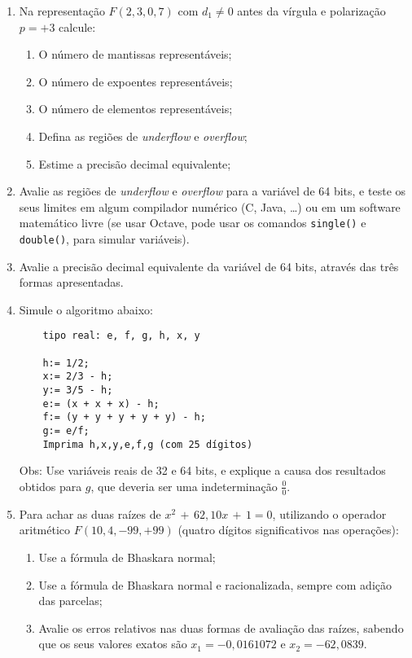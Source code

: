 \documentclass[12pt]{article}
\newenvironment{smallitem}{
    \vspace{-2mm}
    \begin{enumerate}
    \setlength{\parskip}{0pt}
    \setlength{\itemsep}{2pt}
}{
    \vspace{-2mm}
    \end{enumerate}
}
\begin{document}
\begin{enumerate}[label=\textbf{\arabic*})]
\begin{smallitem}
\end{smallitem}

\item Na representação $F(2,3,0,7)$ com $d_1 \neq 0$ antes da vírgula e
polarização $p = +3$ calcule:

\begin{smallitem}

\item O número de mantissas representáveis;
\item O número de expoentes representáveis;
\item O número de elementos representáveis;
\item Defina as regiões de \textit{underflow} e \textit{overflow};
\item Estime a precisão decimal equivalente;

\end{smallitem}

\item Avalie as regiões de \textit{underflow} e \textit{overflow} para a
variável de 64 bits, e teste os seus limites em algum compilador numérico
(C, Java, \dots) ou em um software matemático livre (se usar Octave, pode
usar os comandos \verb!single()! e \verb!double()!, para simular variáveis).

\item Avalie a precisão decimal equivalente da variável de 64 bits, através
das três formas apresentadas.

\item Simule o algoritmo abaixo:
\begin{verbatim}
    tipo real: e, f, g, h, x, y

    h:= 1/2;
    x:= 2/3 - h;
    y:= 3/5 - h;
    e:= (x + x + x) - h;
    f:= (y + y + y + y + y) - h;
    g:= e/f;
    Imprima h,x,y,e,f,g (com 25 dígitos)\end{verbatim}
Obs: Use variáveis reais de 32 e 64 bits, e explique a causa dos resultados
obtidos para $g$, que deveria ser uma indeterminação $\frac{0}{0}$.

\item Para achar as duas raízes de $x^2 \, + \, 62,10x \, + \, 1 = 0$,
utilizando o operador aritmético $F(10, 4, -99, +99)$ (quatro dígitos
significativos nas operações):

\begin{smallitem}

\item Use a fórmula de Bhaskara normal;
\item Use a fórmula de Bhaskara normal e racionalizada, sempre com
adição das parcelas;
\item Avalie os erros relativos nas duas formas de avaliação das
raízes, sabendo que os seus valores exatos são $x_1 = -0,0161072$ e
$x_2 = - 62,0839$.


\end{smallitem}
\end{enumerate}
\end{document}
